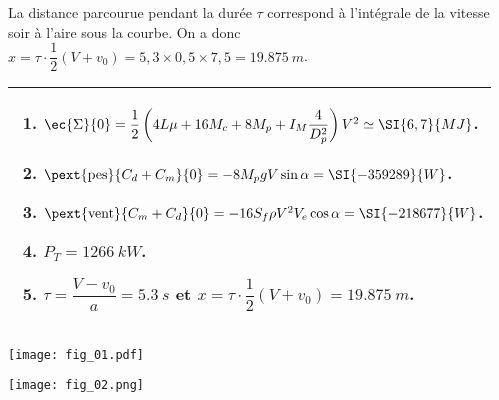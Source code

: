 \begin{multicols}{2}
\begin{corrige}
\begin{minipage}[c]{.5\linewidth}
La distance parcourue pendant la durée $\tau$ correspond à l'intégrale de la vitesse soir à l'aire sous la courbe.
On a donc $x=\tau \cdot\dfrac{1}{2}\left(V+v_0\right)=5,3\times 0,5\times 7,5 = \SI{19,875}{m}$.
\end{minipage}
\end{corrige}\else\fi

\ifcolle
\else
\ifprof
\else
\noindent \footnotesize
\begin{tabular}{|p{\linewidth}|}
\hline
\begin{enumerate}
\item  $\ec{\Sigma}{0}= \dfrac{1}{2}\left(4 L \mu + 16 M_c + 8 M_p  + I_M\dfrac{4}{D_p^2}\right)V^2 \simeq \SI{6,7}{MJ}$.
\item $\pext{\text{pes}}{C_d+C_m}{0}=-8M_pgV \sin \alpha =\SI{-359289}{W}$.
\item $\pext{\text{vent}}{C_m+C_d}{0} =-16S_f \rho V^2 V_e\cos\alpha = \SI{-218677}{W} $.
\item $P_T = \SI{1266}{kW}$.
\item $\tau = \dfrac{V-v_0}{a} = \SI{5,3}{s}$ et $x=\tau \cdot\dfrac{1}{2}\left(V+v_0\right)= \SI{19,875}{m}$.
\end{enumerate} \\
\hline
\end{tabular}
\fi\fi
\normalsize


\ifprof
\else
\end{multicols}
\fi


\ifprof
\else

\begin{center}
\texttt{[image: fig\_01.pdf]}
\end{center}

\begin{center}
\texttt{[image: fig\_02.png]}
\end{center}
\fi
